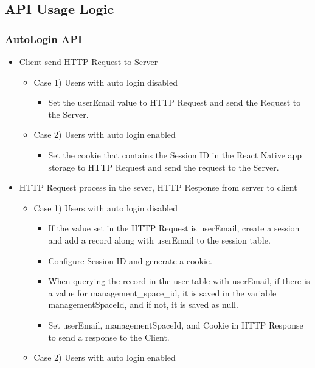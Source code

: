 \documentclass[conference]{IEEEtran}
\begin{document}
\subsection{API Usage Logic}
\subsubsection{AutoLogin API}
\begin{itemize}
    \item Client send HTTP Request to Server
    \begin{itemize}
        \item Case 1) Users with auto login disabled
        \begin{itemize}
            \item Set the userEmail value to HTTP Request and send the Request to the Server.
        \end{itemize}
        \item Case 2) Users with auto login enabled
        \begin{itemize}
            \item Set the cookie that contains the Session ID in the React Native app storage to HTTP Request and send the request to the Server.
            \\
        \end{itemize}
    \end{itemize}
    \item HTTP Request process in the sever, HTTP Response from server to client
    \begin{itemize}
        \item Case 1) Users with auto login disabled
        \begin{itemize}
            \item If the value set in the HTTP Request is userEmail, create a session and add a record along with userEmail to the session table.
            \item Configure Session ID and generate a cookie.
            \item When querying the record in the user table with userEmail, if there is a value for management\_space\_id, it is saved in the variable managementSpaceId, and if not, it is saved as null.
            \item Set userEmail, managementSpaceId, and Cookie in HTTP Response to send a response to the Client.
        \end{itemize}
        \item Case 2) Users with auto login enabled

\end{itemize}
\end{itemize}
\end{document}
